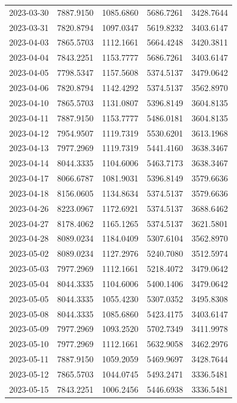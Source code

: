 \begin{footnotesize}
\begin{longtable}{lllll}
2023-03-30 & 7887.9150 & 1085.6860 & 5686.7261 & 3428.7644 \\
2023-03-31 & 7820.8794 & 1097.0347 & 5619.8232 & 3403.6147 \\
2023-04-03 & 7865.5703 & 1112.1661 & 5664.4248 & 3420.3811 \\
2023-04-04 & 7843.2251 & 1153.7777 & 5686.7261 & 3403.6147 \\
2023-04-05 & 7798.5347 & 1157.5608 & 5374.5137 & 3479.0642 \\
2023-04-06 & 7820.8794 & 1142.4292 & 5374.5137 & 3562.8970 \\
2023-04-10 & 7865.5703 & 1131.0807 & 5396.8149 & 3604.8135 \\
2023-04-11 & 7887.9150 & 1153.7777 & 5486.0181 & 3604.8135 \\
2023-04-12 & 7954.9507 & 1119.7319 & 5530.6201 & 3613.1968 \\
2023-04-13 & 7977.2969 & 1119.7319 & 5441.4160 & 3638.3467 \\
2023-04-14 & 8044.3335 & 1104.6006 & 5463.7173 & 3638.3467 \\
2023-04-17 & 8066.6787 & 1081.9031 & 5396.8149 & 3579.6636 \\
2023-04-18 & 8156.0605 & 1134.8634 & 5374.5137 & 3579.6636 \\
2023-04-26 & 8223.0967 & 1172.6921 & 5374.5137 & 3688.6462 \\
2023-04-27 & 8178.4062 & 1165.1265 & 5374.5137 & 3621.5801 \\
2023-04-28 & 8089.0234 & 1184.0409 & 5307.6104 & 3562.8970 \\
2023-05-02 & 8089.0234 & 1127.2976 & 5240.7080 & 3512.5974 \\
2023-05-03 & 7977.2969 & 1112.1661 & 5218.4072 & 3479.0642 \\
2023-05-04 & 8044.3335 & 1104.6006 & 5400.1406 & 3479.0642 \\
2023-05-05 & 8044.3335 & 1055.4230 & 5307.0352 & 3495.8308 \\
2023-05-08 & 8044.3335 & 1085.6860 & 5423.4175 & 3403.6147 \\
2023-05-09 & 7977.2969 & 1093.2520 & 5702.7349 & 3411.9978 \\
2023-05-10 & 7977.2969 & 1112.1661 & 5632.9058 & 3462.2976 \\
2023-05-11 & 7887.9150 & 1059.2059 & 5469.9697 & 3428.7644 \\
2023-05-12 & 7865.5703 & 1044.0745 & 5493.2471 & 3336.5481 \\
2023-05-15 & 7843.2251 & 1006.2456 & 5446.6938 & 3336.5481 \\

\end{longtable}
\end{footnotesize}
